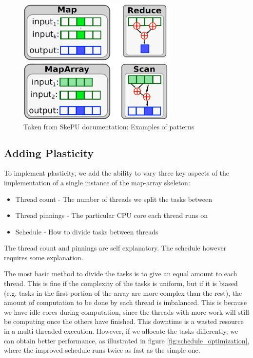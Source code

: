 \begin{figure}
	\centering
	\includegraphics[width=0.7\textwidth]{graphics/skepu_skeletons.jpg}
	\caption{Taken from SkePU documentation: Examples of patterns}
	\label{fig:skepu_skeletons}
\end{figure}



\subsection{Adding Plasticity}
\label{subsection:design_adding_plasticity}

To implement plasticity, we add the ability to vary three key aspects of the implementation of a single instance of the map-array skeleton:

\begin{itemize}
	\item Thread count - The number of threads we split the tasks between
	\item Thread pinnings - The particular CPU core each thread runs on
	\item Schedule - How to divide tasks between threads
\end{itemize}

The thread count and pinnings are self explanatory. The schedule however requires some explanation.

The most basic method to divide the tasks is to give an equal amount to each thread. This is fine if the complexity of the tasks is uniform, but if it is biased (e.g. tasks in the first portion of the array are more complex than the rest), the amount of computation to be done by each thread is imbalanced. This is because we have idle cores during computation, since the threads with more work will still be computing once the others have finished. This downtime is a wasted resource in a multi-threaded execution. However, if we allocate the tasks differently, we can obtain better performance, as illustrated in figure \ref{fig:schedule_optimization}, where the improved schedule runs twice as fast as the simple one.

